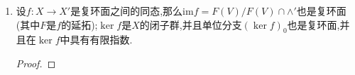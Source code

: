 \begin{enumerate}
\begin{proof}
		取定$V,\wedge$的一组基,那么$X$对应于矩阵$M\in\mathrm{M}(g\times2g,\mathbb{C})$.任取$f\in\mathrm{End}_{\textbf{Tori}}(X)$,记$\rho_a(f)$和$\rho_r(f)$对应的矩阵分别为$A\in\mathrm{M}(g,\mathbb{C})$和$R\in\mathrm{M}(2g,\mathbb{Z})$.从$AM=MR$得到:
		$$\left(\begin{array}{cc}A&0\\0&\overline{A}\end{array}\right)\left(\begin{array}{c}M\\\overline{M}\end{array}\right)=\left(\begin{array}{c}M\\\overline{M}\end{array}\right)R$$
		我们之前解释了$\left(\begin{array}{c}M\\\overline{M}\end{array}\right)$是可逆矩阵.
	\end{proof}
	\item 设$f:X\to X'$是复环面之间的同态,那么$\mathrm{im}f=F(V)/F(V)\cap\wedge'$也是复环面(其中$F$是$f$的延拓);$\ker f$是$X$的闭子群,并且单位分支$(\ker f)_0$也是复环面,并且在$\ker f$中具有有限指数.
	\begin{proof}
		

\end{proof}
\end{enumerate}
